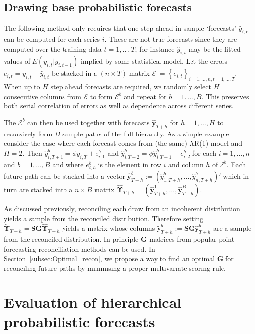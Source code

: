 \documentclass[12pt]{article}
\theoremstyle{definition}
\begin{document}
\subsection{Drawing base probabilistic forecasts} \label{Subsec:Incoherent_samplePaths}
The following method only requires that one-step ahead in-sample `forecasts' $\hat{y}_{i,t}$ can be computed for each series $i$.  These are not true forecasts since they are computed over the training data $t=1,\ldots,T$; for instance  $\hat{y}_{i,t}$ may be the fitted values of $E(y_{i,t}|y_{i,t-1})$ implied by some statistical model. Let the errors $e_{i,t} = y_{i,t} - \hat{y}_{i,t}$ be stacked in a $(n \times T)$ matrix $\bm{\mathcal{E}}:=\left\{e_{i,t}\right\}_{i=1,\dots,n,t=1,\dots,T}$.  When up to $H$ step ahead forecasts are required, we randomly select $H$ consecutive columns from $\bm{\mathcal{E}}$ to form $\bm{\mathcal{E}}^b$ and repeat for $b = 1,\dots,B$.  This preserves both serial correlation of errors as well as dependence across different series.

The $\bm{\mathcal{E}}^b$ can then be used together with forecasts $\hat{\bm{y}}_{T+h}$ for $h=1,\ldots,H$ to recursively form $B$ sample paths of the full hierarchy.  As a simple example consider the case where each forecast comes from (the same) AR(1) model and $H=2$.  Then $\hat{{y}}^b_{i,T+1}=\phi{{y}}_{i,T}+e^b_{i,1}$ and $\hat{{y}}^b_{i,T+2}=\phi\hat{{y}}^b_{i,T+1}+e^b_{i,2}$ for each $i=1,\ldots,n$ and $b=1,\ldots,B$ and where $e^b_{i,h}$ is the element in row $i$ and column $h$ of $\bm{\mathcal{E}}^b$.  Each future path can be stacked into a vector $\hat{\bm{y}}^b_{T+h}:=(\hat{{y}}^b_{1,T+h},\ldots,\hat{{y}}^b_{n,T+h})'$ which in turn are stacked into a $n\times B$ matrix $\hat{\bm{\Upsilon}}_{T+h} = (\hat{\bm{y}}^1_{T+h},\dots,\hat{\bm{y}}^B_{T+h})$.

As discussed previously, reconciling each draw from an incoherent distribution yields a sample from the reconciled distribution.  Therefore setting $\tilde{\bm{\Upsilon}}_{T+h} = \bm{SG}\hat{\bm{\Upsilon}}_{T+h}$ yields a matrix whose columns $\tilde{\bm{y}}^b_{T+h} := \bm{SG}\hat{\bm{y}}^b_{T+h}$ are a sample from the reconciled distribution.  In principle $\bm{G}$ matrices from popular point forecasting reconciliation methods can be used. In Section~\ref{subsec:Optimal_recon}, we propose a way to find an optimal $\bm{G}$ for reconciling future paths by minimising a proper multivariate scoring rule.

\section{Evaluation of hierarchical probabilistic forecasts} \label{sec:evaluation}
\end{document}
